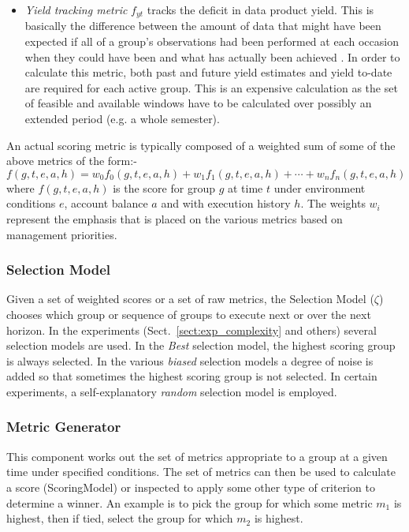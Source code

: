 \begin{itemize}
\item \emph{Yield tracking metric} $f_{yt}$ tracks the deficit in data product yield. This is basically the difference between the amount of data that might have been expected if all of a group's observations had been performed at each occasion when they could have been and what has actually been achieved . In order to calculate this metric, both past and future yield estimates and yield to-date are required for each active group. This is an expensive calculation as the set of feasible and available windows have to be calculated over possibly an extended period (e.g. a whole semester).

\end{itemize}

An actual scoring metric is typically composed of a weighted sum of some of the above metrics of the form:-
\begin{equation}
  f(g,t,e,a,h) = w_0 f_0(g,t,e,a,h) + w_1 f_1(g,t,e,a,h) + \cdots + w_n f_n(g,t,e,a,h)
\end{equation}
where $f(g,t,e,a,h)$ is the score for group $g$ at time $t$ under environment conditions $e$, account balance $a$ and with execution history $h$. The weights $w_i$ represent the emphasis that is placed on the various metrics based on management priorities.

\subsubsection{Selection Model}
Given a set of weighted scores or a set of raw metrics, the Selection Model ($\zeta$) chooses which group or sequence of groups to execute next or over the next horizon.  In the experiments (Sect.~\ref{sect:exp_complexity} and others) several selection models are used. In the \emph{Best} selection model, the highest scoring group is always selected. In the various \emph{biased} selection models a degree of noise is added so that sometimes the highest scoring group is not selected. In certain experiments, a self-explanatory \emph{random} selection model is employed.

\subsubsection{Metric Generator}
This component works out the set of metrics appropriate to a group at a given time under specified conditions. The set of metrics can then be used to calculate a score (ScoringModel) or inspected to apply some other type of criterion to determine a winner. An example is to pick the group for which some metric $m_1$ is highest, then if tied, select the group for which $m_2$ is highest.

